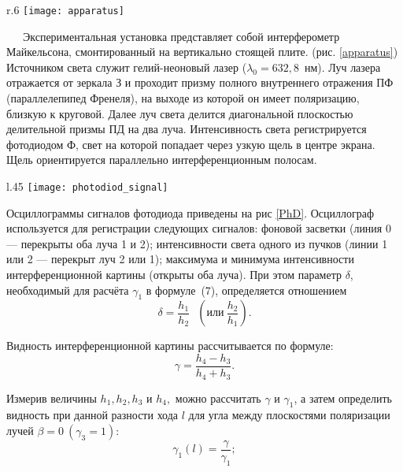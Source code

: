 \documentclass{MagicLabs}
\begin{document}
\begin{wrapfigure}[17]{r}{.6\textwidth}\centering
	\vspace{-3ex}
	\texttt{[image: apparatus]}
	\caption{Схема установки}
	\label{apparatus}
\end{wrapfigure}

\ \ \ Экспериментальная установка представляет собой интерферометр Майкельсона,
смонтированный на вертикально стоящей плите. (рис. \ref{apparatus}) Источником света служит 
гелий-неоновый лазер ($ \lambda_0 = 632,8$~нм). Луч лазера отражается от зеркала З 
и проходит призму полного внутреннего отражения ПФ (параллелепипед Френеля), 
на выходе из которой он имеет поляризацию, близкую к круговой.
Далее луч света делится диагональной плоскостью делительной призмы ПД на два луча.
Интенсивность света регистрируется фотодиодом Ф, свет на которой попадает через 
узкую щель в центре экрана. Щель ориентируется параллельно интерференционным полосам. 

\begin{wrapfigure}[13]{l}{.45\textwidth}\centering
	\vspace{-5ex}
	\texttt{[image: photodiod\_signal]}
	\caption{Осциллограмма сигналов Ф}
	\label{PhD}
\end{wrapfigure}

Осциллограммы сигналов фотодиода приведены на рис \ref{PhD}. Осциллограф используется для
регистрации следующих сигналов: фоновой засветки (линия 0 — перекрыты оба луча 1 и 2);
интенсивности света одного из пучков (линии 1 или 2 — перекрыт луч 2 или 1); максимума 
и минимума интенсивности интерференционной картины (открыты оба луча). 
При этом параметр $ \delta $, необходимый для расчёта $ \gamma_1 $ в формуле~(7),
определяется отношением
\begin{equation}\label{delta}
	\delta = \dfrac{h_1}{h_2}~~~\left(или~\dfrac{h_2}{h_1}\right).
\end{equation}

Видность интерференционной картины рассчитывается по формуле:
\begin{equation}\label{gamma}
	\gamma = \dfrac{h_4 - h_3}{h_4 + h_3}.
\end{equation}

Измерив величины $ h_1, h_2, h_3 $ и $ h_4, $ можно рассчитать $ \gamma $ и $ \gamma_1 $, 
а затем определить видность при данной разности хода $ l $ для угла между плоскостями
поляризации лучей $ \beta = 0~(\gamma_3 = 1): $
\begin{equation}\label{gamma1}
	\gamma_1(l) = \dfrac{\gamma}{\gamma_1};
\end{equation}
\end{document}
